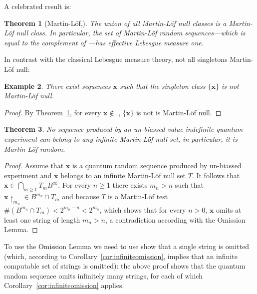\documentclass[%
 preprint,
 showpacs,
 showkeys,
 preprintnumbers,
  amsmath,amssymb,
  aps,
 pra,
  longbibliography,
  floatfix,
 ]{revtex4-1}
\theoremstyle{plain}
\newtheorem{theorem}{Theorem}[section]
\newtheorem{example}[theorem]{Example}
\newcommand{\rest}[2]{#1\!\!\restriction_{#2}}
\newcommand{\BI}{B^\infty}%
\newcommand{\x}{\mathbf{x}}
\begin{document}
A celebrated result is:

    \begin{theorem}[Martin-L\"of,\cite{ML1966}]
    \label{thm:union-null} The union of all Martin-L\"of null classes  is a Martin-L\"of null class. In particular, the set of Martin-L\"of random sequences---which is equal to the complement of ---has effective Lebesgue measure one.
  \end{theorem}


In contrast with the classical Lebesgue measure theory, not all singletons Martin-L\"of null:

  \begin{example}There exist sequences $\x$ such that the singleton class $\{\x\}$ is not
  Martin-L\"of null.
  \end{example}
  \begin{proof}By Theorem~\ref{thm:union-null}, for every   $\x\not\in$ , $\{\x\}$ is not is
  Martin-L\"of null.
\end{proof}







 \begin{theorem}
 \label{thm:QRML}
 No sequence produced by an un-biassed  value indefinite quantum experiment can belong to any infinite Martin-L\"of null set, in particular, it is Martin-L\"of random.
  \end{theorem}
  \begin{proof}Assume that $\x$ is a quantum random sequence produced by un-biassed experiment and $\x$ belongs to an infinite Martin-L\"of null set $T$. It follows that
  $\x \in \bigcap_{m\ge 1} T_{m}\BI$. For every $n\ge 1$ there exists
  $m_n>n$ such that $\rest{\x}{m_n}\in B^{m_n}\cap T_m$ and because
  $T$ is a Martin-L\"of test $\#(B^{m_n}\cap T_m)<2^{m_n-n}<2^{m_n}$,
which shows that for every $n>0$, $\x$ omits at least one string of length $m_n>n$, a contradiction according with the Omission Lemma.
\end{proof}


  To use the Omission Lemma we need to use show that a single string is omitted (which, according to Corollary~\ref{cor:infiniteomission}, implies that an infinite computable set of strings is omitted): the above proof shows that the quantum random sequence omits infinitely many strings, for each of which
  Corollary~\ref{cor:infiniteomission} applies.
\end{document}
